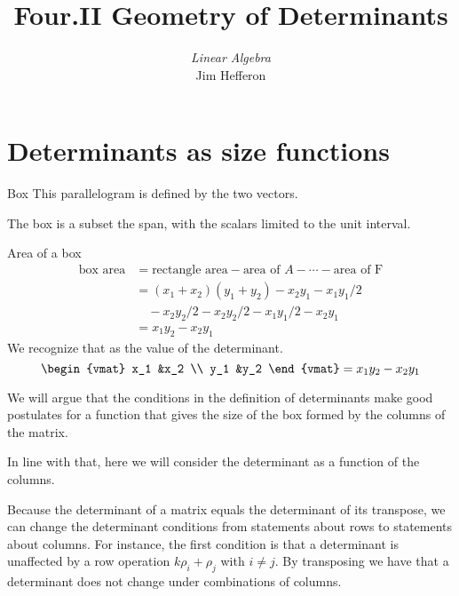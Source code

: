 \documentclass[10pt,t]{beamer}
\title[Geometry of Determinants] %
{Four.II Geometry of Determinants}
\author{\textit{Linear Algebra} \\ {\small Jim Hef{}feron}}
\institute{
  \texttt{http://joshua.smcvt.edu/linearalgebra}
}
\date{}
\begin{document}
\begin{frame}
  \titlepage
\end{frame}




\section{Determinants as size functions}
\begin{frame}{Box}
This parallelogram is defined by the two vectors.

\df[df:Box]

\medskip
The box is a subset the span, with  the scalars limited to the unit 
interval. 
\end{frame}
\begin{frame}{Area of a box}
\begin{align*}
  \text{box area}
  &=\text{rectangle area}-\text{area of $A$}-\cdots-\text{area of F} \\
  &=(x_1+x_2)(y_1+y_2)-x_2y_1-x_1y_1/2        \\
    &\quad-x_2y_2/2-x_2y_2/2-x_1y_1/2-x_2y_1         \\
  &=x_1y_2-x_2y_1        
\end{align*}
\pause
We recognize that as the value of the determinant.
\begin{equation*}
  \begin{vmat}
    x_1  &x_2  \\
    y_1  &y_2
  \end{vmat}
  =x_1y_2-x_2y_1
\end{equation*}
\end{frame}
\begin{frame}
We will argue that
the conditions in the definition of determinants 
make good postulates for a function 
that gives the size of the box formed by the columns of the matrix.  

\pause
In line with that,
here we will consider the determinant as a function of the columns.

\pause
Because the determinant of a matrix equals 
the determinant of its transpose, we can change the determinant conditions
from statements about rows to statements about columns.
For instance, the first condition is that a
determinant is unaffected by a row operation $k\rho_i+\rho_j$ with $i\neq j$.
By transposing we have that a determinant
does not change under combinations of columns. 
\end{frame}
\end{document}
